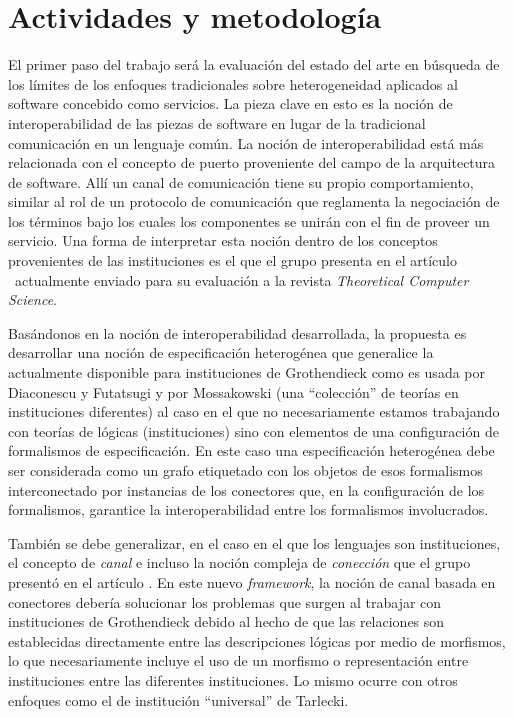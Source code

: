 \documentclass[a4paper, 11pt]{article}
\begin{document}
\section{Actividades y metodología}
El primer paso del trabajo será la evaluación del estado del arte en búsqueda de los límites de los enfoques tradicionales sobre heterogeneidad aplicados al software concebido como servicios. La pieza clave en esto es la noción de interoperabilidad de las piezas de software en lugar de la tradicional comunicación en un lenguaje común. La noción de interoperabilidad está más relacionada con el concepto de puerto proveniente del campo de la arquitectura de software. Allí un canal de comunicación tiene su propio comportamiento, similar al rol de un protocolo de comunicación que reglamenta la negociación de los términos bajo los cuales los componentes se unirán con el fin de proveer un servicio. Una forma de interpretar esta noción dentro de los conceptos provenientes de las instituciones es el que el grupo presenta en el artículo \paperola\ actualmente enviado para su evaluación a la revista \emph{Theoretical Computer Science}.

Basándonos en la noción de interoperabilidad desarrollada, la propuesta es desarrollar una noción de especificación heterogénea que generalice la actualmente disponible para instituciones de Grothendieck \cite{diaconescu:acs-10_4} como es usada por Diaconescu y Futatsugi \cite{diaconescu:tcs-285_2} y por Mossakowski \cite{mossakowski:tacas07} (una ``colección'' de teorías en instituciones diferentes) al caso en el que no necesariamente estamos trabajando con teorías de lógicas (instituciones) sino con elementos de una configuración de formalismos de especificación. En este caso una especificación heterogénea debe ser considerada como un grafo etiquetado con los objetos de esos formalismos interconectado por instancias de los conectores que, en la configuración de los formalismos, garantice la interoperabilidad entre los formalismos involucrados.

También se debe generalizar, en el caso en el que los lenguajes son instituciones, el concepto de \emph{canal} \cite{fiadeiro:amast96} e incluso la noción compleja de \emph{conección} que el grupo presentó en el artículo \paperola. En este nuevo \emph{framework}, la noción de canal basada en conectores debería solucionar los problemas que surgen al trabajar con instituciones de Grothendieck debido al hecho de que las relaciones son establecidas directamente entre las descripciones lógicas por medio de morfismos, lo que necesariamente incluye el uso de un morfismo o representación entre instituciones entre las diferentes instituciones. Lo mismo ocurre con otros enfoques como el de institución ``universal'' de Tarlecki.
\end{document}
